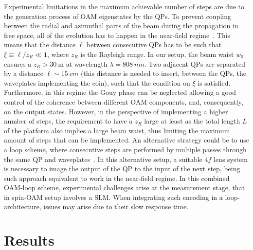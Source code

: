Experimental limitations in the maximum achievable number of steps are due to the generation process of \ac{OAM} eigenstates by the \acp{QP}. To prevent coupling between the radial and azimuthal parts of the beam during the propagation in free space, all of the evolution has to happen in the near-field regime~\cite{karimi2009light,cardano2015quantum}. This means that the distance $\ell$ between consecutive \acp{QP} has to be such that $\xi\equiv \ell/z_R \ll 1 $, where $z_R$ is the Rayleigh range.
In our setup, the beam waist $w_0$  ensures a $z_R> \SI{30}{\meter}$ at wavelength $\lambda=\SI{808}{nm}$. Two adjacent \acp{QP} are separated by a distance $\ell \sim \SI{15}{cm}$ (this distance is needed to insert, between the \acp{QP}, the waveplates implementing the coin), such that the condition on $\xi$ is satisfied.  Furthermore, in this regime the Gouy phase can be neglected allowing a good control of the coherence between different \ac{OAM} components, and, consequently, on the output states. However, in the perspective of implementing a higher number of steps, the requirement to have a $z_R$ large at least as the total length $L$ of the platform also implies a large beam waist, thus limiting the maximum amount of steps that can be implemented. An alternative strategy could be to use a loop scheme, where consecutive steps are performed by multiple passes through the same \ac{QP} and waveplates~\cite{goyal2013implementing}. In this alternative setup, a suitable $4f$ lens system is necessary to image the output of the QP to the input of the next step, being such approach equivalent to work in the near-field regime.  
In this combined \ac{OAM}-loop scheme, experimental challenges arise at the measurement stage, that in spin-\ac{OAM} setup involves a \ac{SLM}. When integrating such encoding in a loop-architecture, issues may arise due to their slow response time.


\section{Results}
\label{sec:expQWs:results}

